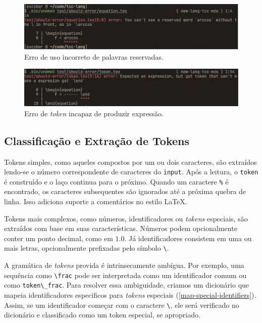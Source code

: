 \begin{figure}[H]
    \caption{\label{error-reserved-word} \small Erro de uso incorreto de palavras reservadas.}
    \begin{center}
        \includegraphics[scale=0.5]{./Imagens/error-reserved-word.png}
    \end{center}
\end{figure}


\begin{figure}[H]
    \caption{\label{error-cant-make-expression} \small Erro de \textit{token} incapaz de produzir expressão.}
    \begin{center}
        \includegraphics[scale=0.5]{./Imagens/error-cant-make-expression.png}
    \end{center}
\end{figure}


\subsection{Classificação e Extração de Tokens}


Tokens simples, como aqueles compostos por um ou dois caracteres, são extraídos lendo-se o número correspondente de caracteres do \texttt{input}. Após a leitura, o \texttt{token} é construído e o laço continua para o próximo. Quando um caractere \texttt{\%} é encontrado, os caracteres subsequentes são ignorados até a próxima quebra de linha. Isso adiciona suporte a comentários no estilo \LaTeX{}.

Tokens mais complexos, como números, identificadores ou \textit{tokens} especiais, são extraídos com base em suas características. Números podem opcionalmente conter um ponto decimal, como em $1.0$. Já identificadores consistem em uma ou mais letras, opcionalmente prefixadas pelo símbolo \verb|\|.

A gramática de \textit{tokens} provida é intrinsecamente ambígua. Por exemplo, uma sequência como \verb|\frac| pode ser interpretada como um identificador comum ou como \verb"token\_frac". Para resolver essa ambiguidade, criamos um dicionário que mapeia identificadores especificos para \textit{tokens} especiais (\autoref{map-special-identifiers}). Assim, se um identificador começar com o caractere \verb|\|, ele será verificado no dicionário e classificado como um token especial, se apropriado.


